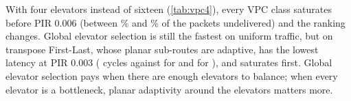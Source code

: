 With four elevators instead of sixteen (\cref{tab:vpc4}), every VPC class saturates before PIR 0.006 (between \% and \% of the packets undelivered) and the ranking changes. Global elevator selection is still the fastest on uniform traffic, but on transpose First-Last, whose planar sub-routes are adaptive, has the lowest latency at PIR 0.003 ( cycles against  for  and  for ), and  saturates first. Global elevator selection pays when there are enough elevators to balance; when every elevator is a bottleneck, planar adaptivity around the elevators matters more.

\begin{table}[tbp]
\centering
\caption{Performance of VPC classes (), 16 elevators; definitions as in \cref{tab:d3fc}.}
\label{tab:d3vpc}
\small

\end{table}

\begin{table}[tbp]
\centering
\caption{VPC classes with four elevators (stride 4): mean latency (cycles), three seeds. $^\ast$More than 1\% of the packets undelivered (saturated; latency of delivered packets only, not ranked).}
\label{tab:vpc4}
\small

\end{table}

